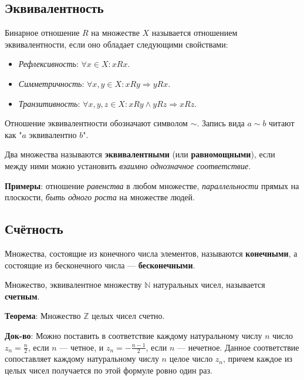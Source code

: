 \subsection{Эквивалентность}

Бинарное отношение $R$ на множестве $X$ называется отношением эквивалентности, если оно обладает следующими свойствами:
\begin{itemize}
    \setlength\itemsep{-0.2em}
    \item \textit{Рефлексивность}: $\forall x \in X : xRx$.
    \item \textit{Симметричность}: $\forall x,y \in X:  xRy \Rightarrow yRx$.
    \item \textit{Транзитивность}: $\forall x,y,z \in X: xRy \wedge yRz \Rightarrow xRz$.
\end{itemize}

Отношение эквивалентности обозначают символом $\sim$. Запись вида $a \sim b$ читают как "$a$ эквивалентно $b$".

Два множества называются \textbf{эквивалентными} (или \textbf{равномощными}), если между ними можно установить \textit{взаимно однозначное соответствие}.

\textbf{Примеры}: отношение \textit{равенства} в любом множестве, \textit{параллельности} прямых на плоскости, \textit{быть одного роста} на множестве людей.

\subsection{Счётность}

Множества, состоящие из конечного числа элементов, называются \textbf{конечными}, а состоящие из бесконечного числа — \textbf{бесконечными}.

Множество, эквивалентное множеству $\mathbb{N}$ натуральных чисел, называется \textbf{счетным}.

\textbf{Теорема}: Множество $\mathbb{Z}$ целых чисел счетно.

\textbf{Док-во}: Можно поставить в соответствие каждому натуральному числу $n$ число $z_n = \frac{n}{2}$, если $n$ — четное, и $z_n = -\frac{n-1}{2}$, если $n$ — нечетное. Данное соответствие сопоставляет каждому натуральному числу $n$ целое число $z_n$, причем каждое из целых чисел получается по этой формуле ровно один раз.

